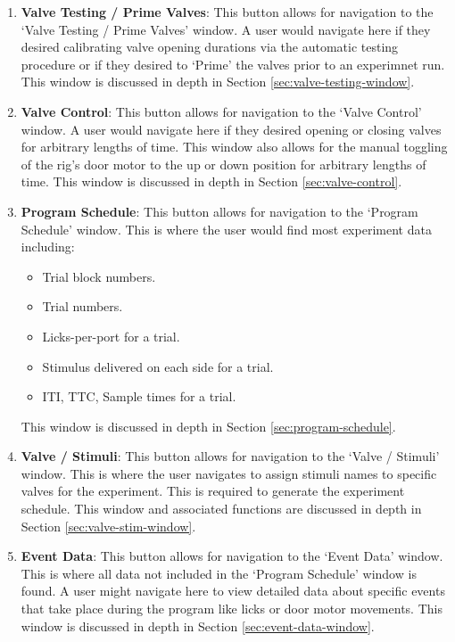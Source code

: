 \documentclass{article}
\begin{document}
\begin{enumerate}
    \item \textbf{Valve Testing / Prime Valves}: This button allows for navigation to the `Valve Testing / Prime Valves' window. A user would
        navigate here if they desired calibrating valve opening durations via the automatic testing procedure or if they desired to 
        `Prime' the valves prior to an experimnet run. This window is discussed in depth in Section \ref{sec:valve-testing-window}.
    \item \textbf{Valve Control}: This button allows for navigation to the `Valve Control' window. A user would navigate here if they 
        desired opening or closing valves for arbitrary lengths of time. This window also allows for the manual toggling of the rig's 
        door motor to the up or down position for arbitrary lengths of time. This window is discussed in depth in 
        Section \ref{sec:valve-control}.
    \item \textbf{Program Schedule}: This button allows for navigation to the `Program Schedule' window. This is where the user would find 
        most experiment data including:
        \begin{itemize}
            \item Trial block numbers.
            \item Trial numbers.
            \item Licks-per-port for a trial.
            \item Stimulus delivered on each side for a trial.
            \item ITI, TTC, Sample times for a trial.
        \end{itemize}
            This window is discussed in depth in Section \ref{sec:program-schedule}.
    \item \textbf{Valve / Stimuli}: This button allows for navigation to the `Valve / Stimuli' window. This is where the user navigates to 
        assign stimuli names to specific valves for the experiment. This is required to generate the experiment schedule. This window 
        and associated functions are discussed in depth in Section \ref{sec:valve-stim-window}.
    \item \textbf{Event Data}: This button allows for navigation to the `Event Data' window. This is where all data not included in the 
        `Program Schedule' window is found. A user might navigate here to view detailed data about specific events that take place during the 
        program like licks or door motor movements. This window is discussed in depth in Section \ref{sec:event-data-window}.

\end{enumerate}
\end{document}
